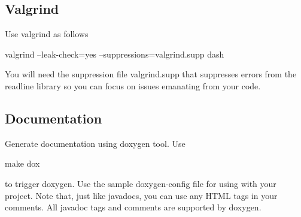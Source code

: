 \subsection*{Valgrind }

Use valgrind as follows

valgrind --leak-\/check=yes --suppressions=valgrind.\-supp dash

You will need the suppression file valgrind.\-supp that suppresses errors from the readline library so you can focus on issues emanating from your code.

\subsection*{Documentation }

Generate documentation using doxygen tool. Use

make dox

to trigger doxygen. Use the sample doxygen-\/config file for using with your project. Note that, just like javadocs, you can use any H\-T\-M\-L tags in your comments. All javadoc tags and comments are supported by doxygen. 